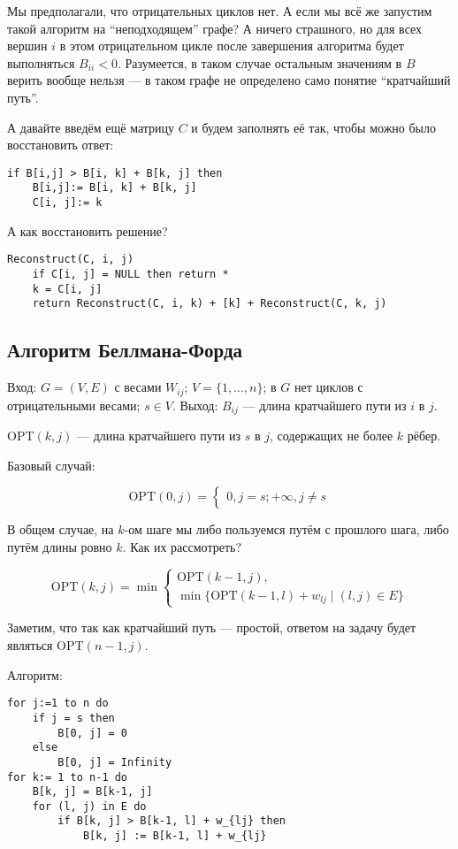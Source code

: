 Мы предполагали, что отрицательных циклов нет. А если мы всё же запустим такой алгоритм на ``неподходящем'' графе? А ничего страшного, но для всех вершин $i$ в этом отрицательном цикле после завершения алгоритма будет выполняться $B_{ii} < 0$. Разумеется, в таком случае остальным значениям в $B$ верить вообще нельзя --- в таком графе не определено само понятие ``кратчайший путь''.

А давайте введём ещё матрицу $C$ и будем заполнять её так, чтобы можно было восстановить ответ:

\begin{lstlisting}
if B[i,j] > B[i, k] + B[k, j] then
    B[i,j]:= B[i, k] + B[k, j]
    C[i, j]:= k
\end{lstlisting}

А как восстановить решение?

\begin{lstlisting}
Reconstruct(C, i, j)
    if C[i, j] = NULL then return *
    k = C[i, j]
    return Reconstruct(C, i, k) + [k] + Reconstruct(C, k, j)
\end{lstlisting}

\subsection{Алгоритм Беллмана-Форда}
Вход: $G = (V, E)$ с весами $W_{ij}$; $V = \{1,\ldots, n\}$; в $G$ нет циклов с отрицательными весами; $s \in V$.
Выход: $B_{ij}$ --- длина кратчайшего пути из $i$ в $j$.

OPT$(k, j)$ --- длина кратчайшего пути из $s$ в $j$, содержащих не более $k$ рёбер.

Базовый случай: 

\[
    \mathrm{OPT}(0, j) = \begin{cases}
        0, j = s;
        +\infty, j\neq s
    \end{cases}
\]

В общем случае, на $k$-ом шаге мы либо пользуемся путём с прошлого шага, либо путём длины ровно $k$. Как их рассмотреть?

\[
    \mathrm{OPT}(k, j) = \min \begin{cases}
        \mathrm{OPT}(k-1, j),\\
        \min\{\mathrm{OPT}(k-1,l)+w_{lj}\mid (l, j)\in E\}
    \end{cases}
\]

Заметим, что так как кратчайший путь --- простой, ответом на задачу будет являться OPT$(n-1, j)$.

Алгоритм:

\begin{lstlisting}
for j:=1 to n do
    if j = s then
        B[0, j] = 0
    else
        B[0, j] = Infinity
for k:= 1 to n-1 do
    B[k, j] = B[k-1, j]
    for (l, j) in E do 
        if B[k, j] > B[k-1, l] + w_{lj} then
            B[k, j] := B[k-1, l] + w_{lj}
\end{lstlisting}


